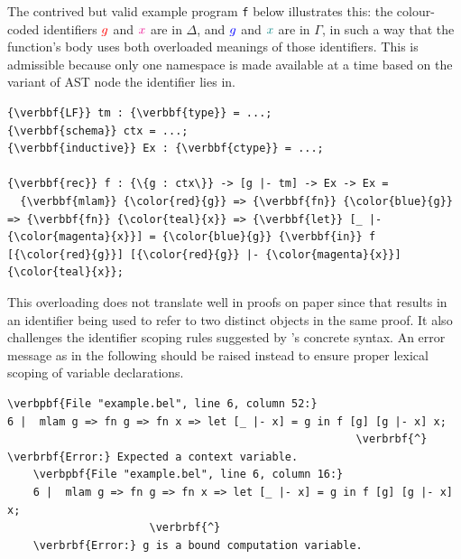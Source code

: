 The contrived but valid example program \verb*|f| below illustrates this: the colour-coded identifiers ${\color{red}{g}}$ and ${\color{magenta}{x}}$ are in $\Delta$, and ${\color{blue}{g}}$ and ${\color{teal}{x}}$ are in $\Gamma$, in such a way that the function's body uses both overloaded meanings of those identifiers.
This is admissible because only one namespace is made available at a time based on the variant of \ac{AST} node the identifier lies in.
\bigskip
\begin{Verbatim}[commandchars=\\\{\}, baselinestretch=1]
{\verbbf{LF}} tm : {\verbbf{type}} = ...;
{\verbbf{schema}} ctx = ...;
{\verbbf{inductive}} Ex : {\verbbf{ctype}} = ...;

{\verbbf{rec}} f : {\{g : ctx\}} -> [g |- tm] -> Ex -> Ex =
  {\verbbf{mlam}} {\color{red}{g}} => {\verbbf{fn}} {\color{blue}{g}} => {\verbbf{fn}} {\color{teal}{x}} => {\verbbf{let}} [_ |- {\color{magenta}{x}}] = {\color{blue}{g}} {\verbbf{in}} f [{\color{red}{g}}] [{\color{red}{g}} |- {\color{magenta}{x}}] {\color{teal}{x}};
\end{Verbatim}
This overloading does not translate well in proofs on paper since that results in an identifier being used to refer to two distinct objects in the same proof.
It also challenges the identifier scoping rules suggested by \Beluga's concrete syntax.
An error message as in the following should be raised instead to ensure proper lexical scoping of variable declarations.
\bigskip
\begin{Verbatim}[commandchars=\\\{\}, baselinestretch=1]
\verbpbf{File "example.bel", line 6, column 52:}  
6 |  mlam g => fn g => fn x => let [_ |- x] = g in f [g] [g |- x] x;
                                                      \verbrbf{^}             
\verbrbf{Error:} Expected a context variable.
    \verbpbf{File "example.bel", line 6, column 16:}
    6 |  mlam g => fn g => fn x => let [_ |- x] = g in f [g] [g |- x] x;
                      \verbrbf{^}                                                 
    \verbrbf{Error:} g is a bound computation variable.
\end{Verbatim}

